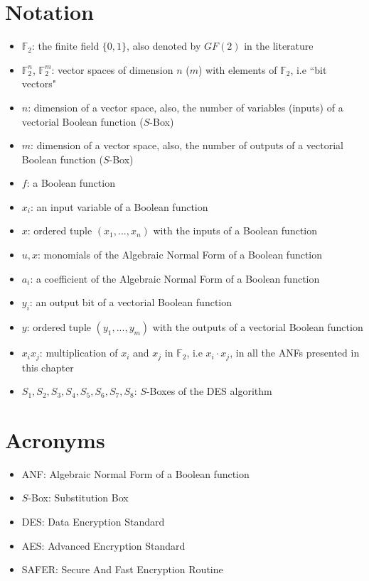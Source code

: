 \documentclass{report}
\begin{document}
\section{Notation}
\begin{itemize}
    \item $\mathbb{F}_2$: the finite field $\{0, 1\}$, also denoted by $GF(2)$ in the literature
    \item $\mathbb{F}^n_2$, $\mathbb{F}^m_2$: vector spaces of dimension $n$ ($m$) with elements of $\mathbb{F}_2$, i.e ``bit vectors"
    \item $n$: dimension of a vector space, also, the number of variables (inputs) of a vectorial Boolean function ($S$-Box)
    \item $m$: dimension of a vector space, also, the number of outputs of a vectorial Boolean function ($S$-Box)
    \item $f$: a Boolean function
    \item $x_i$: an input variable of a Boolean function
    \item $x$: ordered tuple $(x_1, ..., x_n)$ with the inputs of a Boolean function
    \item $u, x$: monomials of the Algebraic Normal Form of a Boolean function
    \item $a_i$: a coefficient of the Algebraic Normal Form of a Boolean function
    \item $y_i$: an output bit of a vectorial Boolean function
    \item $y$: ordered tuple $(y_1, ..., y_m)$ with the outputs of a vectorial Boolean function
    \item $x_ix_j$: multiplication of $x_i$ and $x_j$ in $\mathbb{F}_2$, i.e $x_i \cdot x_j$, in all the ANFs presented in this chapter
    \item $S_1, S_2, S_3, S_4, S_5, S_6, S_7, S_8$: $S$-Boxes of the DES algorithm
\end{itemize}

\section{Acronyms}
\begin{itemize}
    \item ANF: Algebraic Normal Form of a Boolean function
    \item $S$-Box: Substitution Box
    \item DES: Data Encryption Standard
    \item AES: Advanced Encryption Standard
    \item SAFER: Secure And Fast Encryption Routine
\end{itemize}
\end{document}
